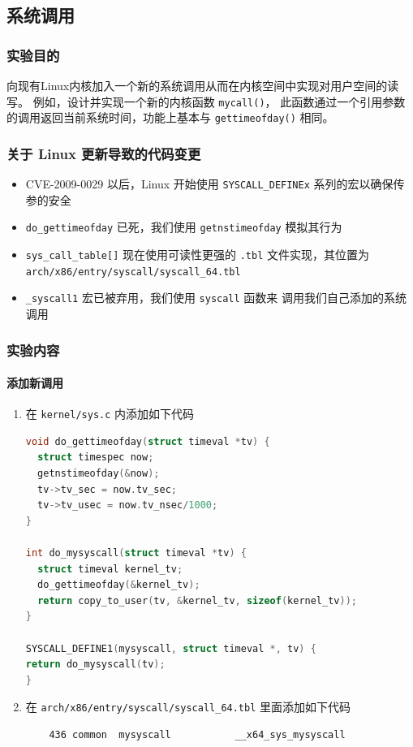 \documentclass[blue,normal,cn]{elegantnote}
\newcommand{\code}[1]{\colorbox{light-gray}{\texttt{#1}}}
\begin{document}
\subsection{系统调用}
\subsubsection{实验目的}
向现有Linux内核加入一个新的系统调用从而在内核空间中实现对用户空间的读写。
例如，设计并实现一个新的内核函数 \code{mycall()}，
此函数通过一个引用参数的调用返回当前系统时间，功能上基本与
\code{gettimeofday()} 相同。
\subsubsection{关于 Linux 更新导致的代码变更}
\begin{itemize}
  \item CVE-2009-0029 以后，Linux 开始使用 \code{SYSCALL\_DEFINEx}
  系列的宏以确保传参的安全
  \item \code{do\_gettimeofday} 已死，我们使用 \code{getnstimeofday}
  模拟其行为
  \item \code{sys\_call\_table[]} 现在使用可读性更强的
  \code{.tbl}
  文件实现，其位置为 \\
  \code{arch/x86/entry/syscall/syscall\_64.tbl}
  \item \code{\_syscall1} 宏已被弃用，我们使用 \code{syscall} 函数来
  调用我们自己添加的系统调用
\end{itemize}
\subsubsection{实验内容}
\paragraph{添加新调用}
\begin{enumerate}
  \item 在 \code{kernel/sys.c} 内添加如下代码
  \begin{lstlisting}[language=C]
void do_gettimeofday(struct timeval *tv) {
  struct timespec now;
  getnstimeofday(&now);
  tv->tv_sec = now.tv_sec;
  tv->tv_usec = now.tv_nsec/1000;
}
   
int do_mysyscall(struct timeval *tv) {
  struct timeval kernel_tv;
  do_gettimeofday(&kernel_tv);
  return copy_to_user(tv, &kernel_tv, sizeof(kernel_tv));
}
   
SYSCALL_DEFINE1(mysyscall, struct timeval *, tv) {
return do_mysyscall(tv);
}
  \end{lstlisting}
  \item 在 \code{arch/x86/entry/syscall/syscall\_64.tbl} 
  里面添加如下代码
  \begin{lstlisting}
    436	common	mysyscall			__x64_sys_mysyscall
  \end{lstlisting}
\end{enumerate}
\end{document}
